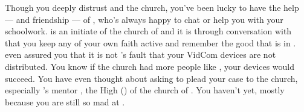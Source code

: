 \documentclass[char]{GL2020}
\begin{document}
Though you deeply distrust \cAntiChup{} and the church, you've been lucky to have the help — and friendship — of \cScholarship{\full}, who's always happy to chat or help you with your schoolwork. \cScholarship{} is an initiate of the church of \cTechGod{} and it is through conversation with \cScholarship{\them} that you keep any of your own faith active and remember the good that is in \cTechGod{}. \cScholarship{\They} \cScholarship{\have} even assured you that it is not \cTechGod{}’s fault that your VidCom devices are not distributed. You know if the church had more people like \cScholarship{}, your devices would succeed. You have even thought about asking \cScholarship{\them} to plead your case to the church, especially \cScholarship{}’s mentor \cAntiChup{}, the High \cAntiChup(\Cleric) of the church of \cTechGod{}. You haven’t yet, mostly because you are still so mad at \cAntiChup{}.
\end{document}
